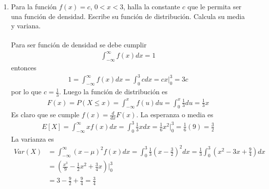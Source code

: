 \documentclass{article}
\begin{document}
\begin{enumerate}
\item Para la funci\'on $f(x) = c$, $0 <x < 3$, halla la constante $c$ que le permita ser una funci\'on de densidad. Escribe su funci\'on de distribuci\'on. Calcula su media y variana.
\\ \\
Para ser funci\'on de densidad se debe cumplir
\begin{align*}
\int_{-\infty} ^{\infty} f(x) dx = 1
\end{align*}
entonces
\begin{align*}
1 = \int_{-\infty} ^{\infty} f(x) dx = \int_0 ^3cdx =cx|_0^3 = 3c
\end{align*}
por lo que $c= \frac{1}{3}$. Luego la funci\'on de distribuci\'on es
\begin{align*}
F(x) = P(X \leq x) = \int_{-\infty}^x f(u)du = \int_{0}^x\frac{1}{3}du = \frac{1}{3}x
\end{align*}
Es claro que se cumple $f(x ) = \frac{d}{dx}F(x)$. La esperanza o media es
\begin{align*}
E[X] = \int_{-\infty}^{\infty}xf(x) dx = \int_0^3\frac{1}{3}xdx = \frac{1}{6}x^2|_0^3 = \frac{1}{6}(9) = \frac{3}{2}
\end{align*}
La varianza es 
\begin{align*}
Var(X) &= \int_{-\infty}^{\infty}(x- \mu)^2f(x)dx = \int_0^3 \frac{1}{3}\left(x-\frac{3}{2}\right)^2dx = \frac{1}{3}\int_0^3\left(x^2 - 3x + \frac{9}{4}\right)dx& \\
& = \left(\frac{x^3}{9} - \frac{1}{2}x^2+\frac{3}{4}x\right)|_0^3 \\
& = 3-\frac{9}{2}+\frac{9}{4} = \frac{3}{4}
\end{align*}


\end{enumerate}
\end{document}

